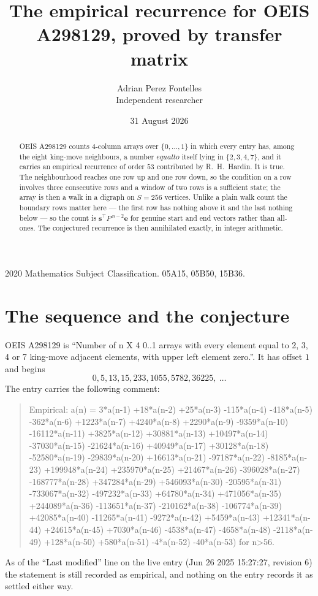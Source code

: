 \documentclass[11pt,a4paper]{article}
\title{The empirical recurrence for OEIS A298129, proved by transfer matrix}
\author{Adrian Perez Fontelles\\ \small Independent researcher}
\date{31 August 2026}
\theoremstyle{plain}
\theoremstyle{definition}
\begin{document}
\maketitle

\begin{abstract}
OEIS A298129 counts $4$-column arrays over $\{0,\dots,1\}$ in which every entry has,
among the eight king-move neighbours, a number $equal to$ itself lying in $\{2,3,4,7\}$, and it carries an empirical
recurrence of order $53$ contributed by R.~H.~Hardin. It is true. The neighbourhood
reaches one row up and one row down, so the condition on a row involves three consecutive
rows and a window of two rows is a sufficient state; the array is then a walk in a digraph
on $S=256$ vertices. Unlike a plain walk count the boundary rows matter here --- the first
row has nothing above it and the last nothing below --- so the count is
$\mathbf{s}^{\!\top}P^{\,n-2}\mathbf{e}$ for genuine start and end vectors rather than
all-ones. The conjectured recurrence is then annihilated exactly, in integer arithmetic.
\end{abstract}

\noindent\small 2020 Mathematics Subject Classification. 05A15, 05B50, 15B36.\normalsize

\section{The sequence and the conjecture}

OEIS A298129 is ``Number of n X 4 0..1 arrays with every element equal to 2, 3, 4 or 7 king-move adjacent elements, with upper left element zero.''. It has offset
$1$ and begins
\[
0, 5, 13, 15, 233, 1055, 5782, 36225,\ \dots
\]
The entry carries the following comment:
\begin{quote}\small
Empirical: a(n) = 3*a(n-1) +18*a(n-2) +25*a(n-3) -115*a(n-4) -418*a(n-5) -362*a(n-6) +1223*a(n-7) +4240*a(n-8) +2290*a(n-9) -9359*a(n-10) -16112*a(n-11) +3825*a(n-12) +30881*a(n-13) +10497*a(n-14) -37030*a(n-15) -21624*a(n-16) +40949*a(n-17) +30128*a(n-18) -52580*a(n-19) -29839*a(n-20) +16613*a(n-21) -97187*a(n-22) -8185*a(n-23) +199948*a(n-24) +235970*a(n-25) +21467*a(n-26) -396028*a(n-27) -168777*a(n-28) +347284*a(n-29) +546093*a(n-30) -20595*a(n-31) -733067*a(n-32) -497232*a(n-33) +64780*a(n-34) +471056*a(n-35) +244089*a(n-36) -113651*a(n-37) -210162*a(n-38) -106774*a(n-39) +42085*a(n-40) -11265*a(n-41) -9272*a(n-42) +5459*a(n-43) +12341*a(n-44) +24615*a(n-45) +7030*a(n-46) -4538*a(n-47) -4658*a(n-48) -2118*a(n-49) +128*a(n-50) +580*a(n-51) -4*a(n-52) -40*a(n-53) for n>56.
\end{quote}
As of the ``Last modified'' line on the live entry (Jun 26 2025 15:27:27, revision
6) the statement is still recorded as empirical, and nothing on the entry
records it as settled either way.
\end{document}
